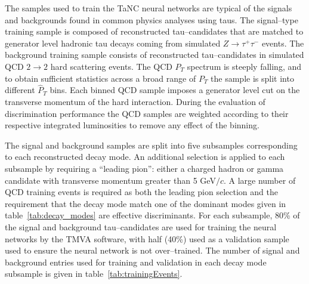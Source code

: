 The samples used to train the TaNC neural networks are typical of the signals
and backgrounds found in common physics analyses using taus.  The signal--type
training sample is composed of reconstructed tau--candidates that are matched
to generator level hadronic tau decays coming from simulated $Z \rightarrow
\tau^{+}\tau^{-}$ events.  The background training sample consists of
reconstructed tau--candidates in simulated QCD $2\rightarrow2$ hard scattering
events.  The QCD $P_T$ spectrum is steeply falling, and to obtain sufficient
statistics across a broad range of $P_T$ the sample is split into different
$\hat P_{T}$ bins.  Each binned QCD sample imposes a generator level cut on the
transverse momentum of the hard interaction.  During the evaluation of discrimination
performance the QCD samples are weighted according to their respective
integrated luminosities to remove any effect of the binning.

The signal and background samples are split into five subsamples corresponding
to each reconstructed decay mode.  An additional selection is applied to each
subsample by requiring a ``leading pion'': either a charged hadron or gamma
candidate with transverse momentum greater than 5 GeV$/c$.  A large number of
QCD training events is required as both the leading pion selection and the
requirement that the decay mode match one of the dominant modes given in
table~\ref{tab:decay_modes} are effective discriminants.  For each subsample,
80\% of the signal and background tau--candidates are used for training the
neural networks by the TMVA software, with half (40\%) used as a validation
sample used to ensure the neural network is not over--trained. The number of
signal and background entries used for training and validation in each decay
mode subsample is given in table~\ref{tab:trainingEvents}.


